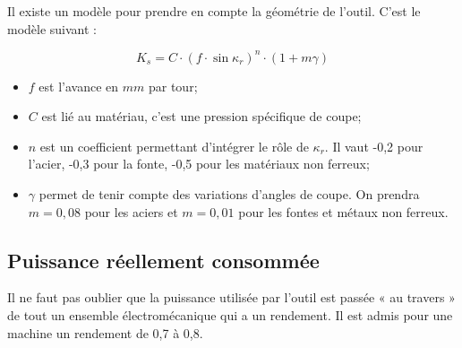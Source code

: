 \documentclass[11pt,oneside]{article}
\begin{document}
Il existe un modèle pour prendre en compte la géométrie de l'outil. C'est le modèle suivant :

$$
K_s = C\cdot \left(f\cdot \sin\kappa_r\right)^n \cdot \left(1+m\gamma\right)
$$
\begin{itemize}
\item $f$ est l'avance en $mm$ par tour;
\item $C$ est lié au matériau, c'est une pression spécifique de coupe;
\item $n$ est un coefficient permettant d'intégrer le rôle de $\kappa_r$. Il vaut -0,2 pour l'acier, -0,3 pour la fonte, -0,5 pour les matériaux non  ferreux;
\item $\gamma$ permet de tenir compte des variations d'angles de coupe. On prendra $m = 0,08$ pour les aciers et $m = 0,01$ pour les fontes et métaux non ferreux.
\end{itemize}

\subsection{Puissance réellement consommée}
Il ne faut pas oublier que la puissance utilisée par l'outil est passée « au travers » de tout un ensemble électromécanique qui a un rendement. Il est admis pour une machine un rendement de 0,7 à 0,8.
\end{document}
